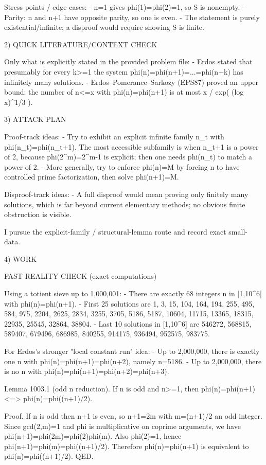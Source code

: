Stress points / edge cases:
- n=1 gives phi(1)=phi(2)=1, so S is nonempty.
- Parity: n and n+1 have opposite parity, so one is even.
- The statement is purely existential/infinite; a disproof would require showing S is finite.

2) QUICK LITERATURE/CONTEXT CHECK

Only what is explicitly stated in the provided problem file:
- Erdos stated that presumably for every k>=1 the system phi(n)=phi(n+1)=...=phi(n+k) has infinitely many solutions.
- Erdos--Pomerance--Sarkozy (EPS87) proved an upper bound: the number of n<=x with phi(n)=phi(n+1) is at most
  x / exp( (log x)^{1/3} ).

3) ATTACK PLAN

Proof-track ideas:
- Try to exhibit an explicit infinite family n_t with phi(n_t)=phi(n_t+1). The most accessible subfamily is when n_t+1 is a power of 2, because phi(2^m)=2^{m-1} is explicit; then one needs phi(n_t) to match a power of 2.
- More generally, try to enforce phi(n)=M by forcing n to have controlled prime factorization, then solve phi(n+1)=M.

Disproof-track ideas:
- A full disproof would mean proving only finitely many solutions, which is far beyond current elementary methods; no obvious finite obstruction is visible.

I pursue the explicit-family / structural-lemma route and record exact small-data.

4) WORK

FAST REALITY CHECK (exact computations)

Using a totient sieve up to 1,000,001:
- There are exactly 68 integers n in [1,10^6] with phi(n)=phi(n+1).
- First 25 solutions are
  1, 3, 15, 104, 164, 194, 255, 495, 584, 975, 2204, 2625, 2834, 3255, 3705, 5186, 5187,
  10604, 11715, 13365, 18315, 22935, 25545, 32864, 38804.
- Last 10 solutions in [1,10^6] are
  546272, 568815, 589407, 679496, 686985, 840255, 914175, 936494, 952575, 983775.

For Erdos's stronger "local constant run" idea:
- Up to 2,000,000, there is exactly one n with phi(n)=phi(n+1)=phi(n+2), namely n=5186.
- Up to 2,000,000, there is no n with phi(n)=phi(n+1)=phi(n+2)=phi(n+3).

Lemma 1003.1 (odd n reduction).
If n is odd and n>=1, then
  phi(n)=phi(n+1)  <=>  phi(n)=phi((n+1)/2).

Proof.
If n is odd then n+1 is even, so n+1=2m with m=(n+1)/2 an odd integer.
Since gcd(2,m)=1 and phi is multiplicative on coprime arguments, we have
  phi(n+1)=phi(2m)=phi(2)phi(m).
Also phi(2)=1, hence phi(n+1)=phi(m)=phi((n+1)/2).
Therefore phi(n)=phi(n+1) is equivalent to phi(n)=phi((n+1)/2).  QED.


